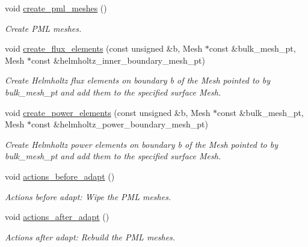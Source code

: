 \begin{DoxyCompactItemize}
void \hyperlink{classPMLProblem_aa111bfe53d52cf6b2e1bb3b079c16d43}{create\+\_\+pml\+\_\+meshes} ()
\begin{DoxyCompactList}\small\item\em Create P\+ML meshes. \end{DoxyCompactList}\item 
void \hyperlink{classPMLProblem_a748701cc016c2bfd07ed2d2467268b5d}{create\+\_\+flux\+\_\+elements} (const unsigned \&b, Mesh $\ast$const \&bulk\+\_\+mesh\+\_\+pt, Mesh $\ast$const \&helmholtz\+\_\+inner\+\_\+boundary\+\_\+mesh\+\_\+pt)
\begin{DoxyCompactList}\small\item\em Create Helmholtz flux elements on boundary b of the Mesh pointed to by bulk\+\_\+mesh\+\_\+pt and add them to the specified surface Mesh. \end{DoxyCompactList}\item 
void \hyperlink{classPMLProblem_afcd6ccc306c79d30d998530c58328b85}{create\+\_\+power\+\_\+elements} (const unsigned \&b, Mesh $\ast$const \&bulk\+\_\+mesh\+\_\+pt, Mesh $\ast$const \&helmholtz\+\_\+power\+\_\+boundary\+\_\+mesh\+\_\+pt)
\begin{DoxyCompactList}\small\item\em Create Helmholtz power elements on boundary b of the Mesh pointed to by bulk\+\_\+mesh\+\_\+pt and add them to the specified surface Mesh. \end{DoxyCompactList}\item 
void \hyperlink{classPMLProblem_a310fb36ad1401d9d975957ecee43accc}{actions\+\_\+before\+\_\+adapt} ()
\begin{DoxyCompactList}\small\item\em Actions before adapt\+: Wipe the P\+ML meshes. \end{DoxyCompactList}\item 
void \hyperlink{classPMLProblem_a732f94d99e7ef65096d6e8d227f9cbc9}{actions\+\_\+after\+\_\+adapt} ()
\begin{DoxyCompactList}\small\item\em Actions after adapt\+: Rebuild the P\+ML meshes. \end{DoxyCompactList}\end{DoxyCompactItemize}
